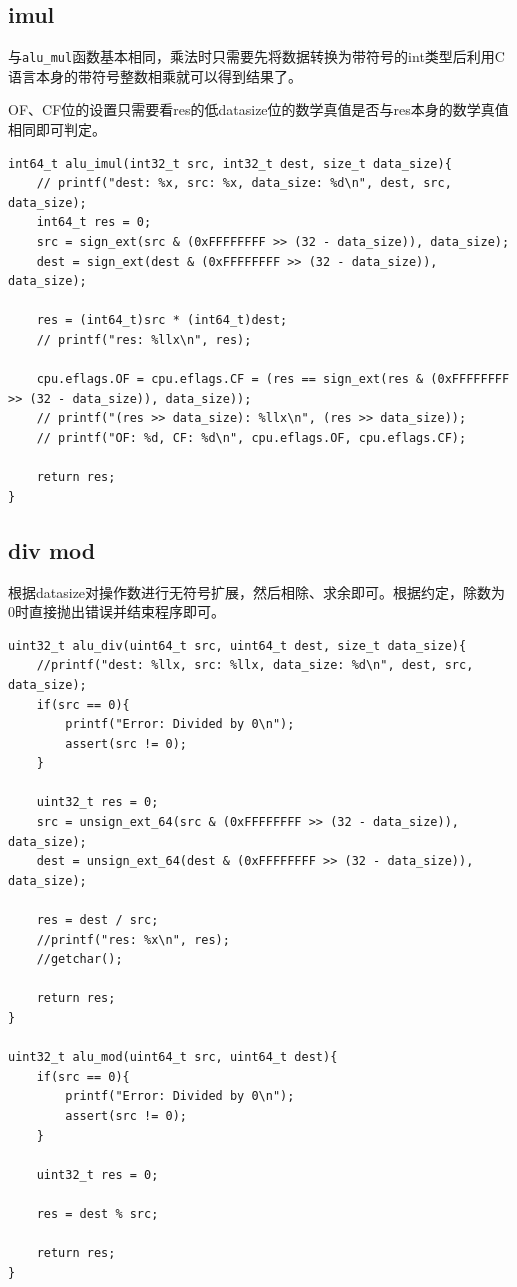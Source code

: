 \documentclass[UTF8]{ctexart}
\begin{document}
\subsection{imul}
与\verb|alu_mul|函数基本相同，乘法时只需要先将数据转换为带符号的int类型后利用C语言本身的带符号整数相乘就可以得到结果了。

\par OF、CF位的设置只需要看res的低datasize位的数学真值是否与res本身的数学真值相同即可判定。

\begin{lstlisting}[style=CStyle]
int64_t alu_imul(int32_t src, int32_t dest, size_t data_size){
    // printf("dest: %x, src: %x, data_size: %d\n", dest, src, data_size);
    int64_t res = 0;
    src = sign_ext(src & (0xFFFFFFFF >> (32 - data_size)), data_size);
    dest = sign_ext(dest & (0xFFFFFFFF >> (32 - data_size)), data_size);
    
    res = (int64_t)src * (int64_t)dest;
    // printf("res: %llx\n", res);
    
    cpu.eflags.OF = cpu.eflags.CF = (res == sign_ext(res & (0xFFFFFFFF >> (32 - data_size)), data_size));
    // printf("(res >> data_size): %llx\n", (res >> data_size));
    // printf("OF: %d, CF: %d\n", cpu.eflags.OF, cpu.eflags.CF);
    
    return res;
}
\end{lstlisting}

\subsection{div mod}
根据datasize对操作数进行无符号扩展，然后相除、求余即可。根据约定，除数为0时直接抛出错误并结束程序即可。

\begin{lstlisting}[style=CStyle]
uint32_t alu_div(uint64_t src, uint64_t dest, size_t data_size){
    //printf("dest: %llx, src: %llx, data_size: %d\n", dest, src, data_size);
    if(src == 0){
        printf("Error: Divided by 0\n");
        assert(src != 0);
    }
    
    uint32_t res = 0;
    src = unsign_ext_64(src & (0xFFFFFFFF >> (32 - data_size)), data_size);
    dest = unsign_ext_64(dest & (0xFFFFFFFF >> (32 - data_size)), data_size);
    
    res = dest / src;
    //printf("res: %x\n", res);
    //getchar();
    
    return res;
}

uint32_t alu_mod(uint64_t src, uint64_t dest){
    if(src == 0){
        printf("Error: Divided by 0\n");
        assert(src != 0);
    }
    
    uint32_t res = 0;
    
    res = dest % src;
    
    return res;
}
\end{lstlisting}
\end{document}

